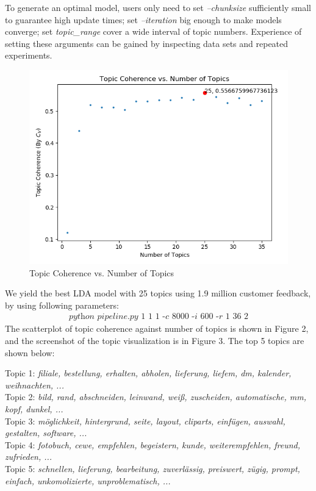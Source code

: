 \documentclass{article} %
\begin{document}
To generate an optimal model, users only need to set \textit{--chunksize} sufficiently small to guarantee high update times; set \textit{--iteration} big enough to make models converge; set \textit{topic\_range} cover a wide interval of topic numbers. Experience of setting these arguments can be gained by inspecting data sets and repeated experiments. 

\begin{figure}[H]
      \graphicspath{ {images/} }
      \begin{center}
            \includegraphics[scale=0.8]{coherence.png}
      \end{center}
      \caption{Topic Coherence vs. Number of Topics}
\end{figure}

We yield the best LDA model with 25 topics using 1.9 million customer feedback, by using following parameters: 
\begin{align}
      \textit{python pipeline.py 1 1 1 -c 8000 -i 600 -r 1 36 2}
\end{align} 
 The scatterplot of topic coherence against number of topics is shown in Figure 2, and the screenshot of the topic visualization is in Figure 3. The top 5 topics are shown below:

Topic 1: \textit{filiale, bestellung, erhalten, abholen, lieferung, liefem, dm, kalender, weihnachten, ...}\\
Topic 2: \textit{bild, rand, abschneiden, leinwand, weiß, zuscheiden, automatische, mm, kopf, dunkel, ...}\\
Topic 3: \textit{möglichkeit, hintergrund, seite, layout, cliparts, einfügen, auswahl, gestalten, software, ...}\\
Topic 4: \textit{fotobuch, cewe, empfehlen, begeistern, kunde, weiterempfehlen, freund, zufrieden, ...}\\
Topic 5: \textit{schnellen, lieferung, bearbeitung, zuverlässig, preiswert, zügig, prompt, einfach, unkomolizierte, unproblematisch, ...}
\end{document}
